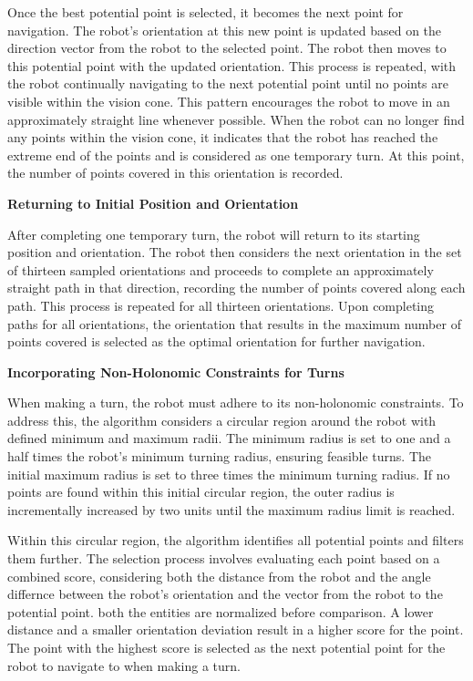 \vspace{3mm}  

Once the best potential point is selected, it becomes the next point for navigation. The robot's orientation at this new point is updated based on the direction vector from the robot to the selected point. The robot then moves to this potential point with the updated orientation. This process is repeated, with the robot continually navigating to the next potential point until no points are visible within the vision cone. This pattern encourages the robot to move in an approximately straight line whenever possible. When the robot can no longer find any points within the vision cone, it indicates that the robot has reached the extreme end of the points and is considered as one temporary turn. At this point, the number of points covered in this orientation is recorded.

\vspace{3mm}  

\textbf{Returning to Initial Position and Orientation}

After completing one temporary turn, the robot will return to its starting position and orientation. The robot then considers the next orientation in the set of thirteen sampled orientations and proceeds to complete an approximately straight path in that direction, recording the number of points covered along each path. This process is repeated for all thirteen orientations. Upon completing paths for all orientations, the orientation that results in the maximum number of points covered is selected as the optimal orientation for further navigation.
\vspace{3mm}  

\textbf{Incorporating Non-Holonomic Constraints for Turns}

When making a turn, the robot must adhere to its non-holonomic constraints. To address this, the algorithm considers a circular region around the robot with defined minimum and maximum radii. The minimum radius is set to one and a half times the robot's minimum turning radius, ensuring feasible turns. The initial maximum radius is set to three times the minimum turning radius. If no points are found within this initial circular region, the outer radius is incrementally increased by two units until the maximum radius limit is reached.
\vspace{3mm}  

Within this circular region, the algorithm identifies all potential points and filters them further. The selection process involves evaluating each point based on a combined score, considering both the distance from the robot and the angle differnce between the robot's orientation and the vector from the robot to the potential point. both the entities are normalized before comparison. A lower distance and a smaller orientation deviation result in a higher score for the point. The point with the highest score is selected as the next potential point for the robot to navigate to when making a turn.
\vspace{3mm}  

